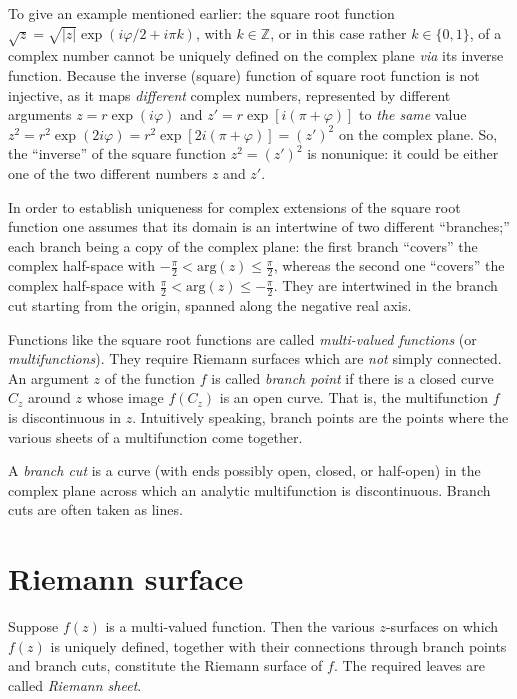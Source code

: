 To give an example mentioned earlier: the square root function $\sqrt{z} =
\sqrt{\vert z\vert } \exp \left(i\varphi / 2 +  i \pi  k \right)$, with $k\in \mathbb{Z}$, or in this case rather $k\in \{0,1\}$,
of a complex number cannot be uniquely defined on the complex plane {\it via} its inverse function.
Because the
inverse (square) function of square root function is not injective, as it
maps {\em different} complex numbers,
represented by different arguments
$z=r \exp(i\varphi )$
and
$z'= r \exp[i(\pi + \varphi )]$
to {\em the same} value
$z^2=r^2 \exp(2i\varphi )= r^2 \exp[2i(\pi + \varphi )]=(z')^2$
on the complex plane.
So, the ``inverse'' of the square function $z^2=(z')^2$ is nonunique: it could be either one of the two different numbers $z$ and $z'$.

In order to establish uniqueness for complex extensions of the square root function
one assumes that its domain is an intertwine
of two different ``branches;'' each branch being a copy of the complex plane:
the first branch ``covers'' the complex half-space with
$-\frac{\pi}{2} < \textrm{arg}(z) \le \frac{\pi}{2}$, whereas the second one ``covers'' the complex half-space with
$ \frac{\pi}{2} < \textrm{arg}(z) \le -\frac{\pi}{2}$.
They are intertwined in the branch cut starting from the origin, spanned along the negative real axis.

Functions like the square root functions are called {\em multi-valued functions} (or {\em multifunctions}).
They require  Riemann surfaces which are {\em not} simply connected.
An argument
$z$ of the function $f$ is called
{\em branch point}
if there is a closed curve $C_z$ around $z$ whose image $f(C_z)$ is an open curve.
That is, the multifunction $f$ is discontinuous in $z$.
Intuitively speaking, branch points are the points where the various sheets of a multifunction come together.

A {\em branch cut} is a curve (with ends possibly open, closed, or half-open)
in the complex plane across which an analytic multifunction is discontinuous.
Branch cuts are often taken as lines.

 \section{Riemann surface}
Suppose $f(z)$ is a multi-valued function.
Then the various $z$-surfaces on which $f(z)$ is uniquely defined,
together with their connections through branch points and branch cuts,
constitute the Riemann surface of $f$.
The required leaves are called {\em Riemann sheet}.

